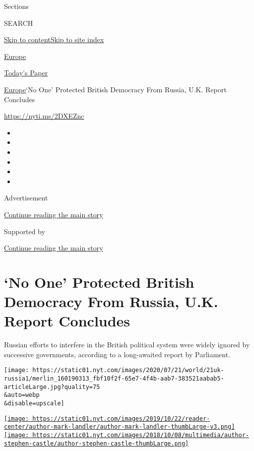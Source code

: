 Sections

SEARCH

\protect\hyperlink{site-content}{Skip to
content}\protect\hyperlink{site-index}{Skip to site index}

\href{https://www.nytimes.com/section/world/europe}{Europe}

\href{https://myaccount.nytimes.com/auth/login?response_type=cookie\&client_id=vi}{}

\href{https://www.nytimes.com/section/todayspaper}{Today's Paper}

\href{/section/world/europe}{Europe}\textbar{}`No One' Protected British
Democracy From Russia, U.K. Report Concludes

\url{https://nyti.ms/2DXEZnc}

\begin{itemize}
\item
\item
\item
\item
\item
\item
\end{itemize}

Advertisement

\protect\hyperlink{after-top}{Continue reading the main story}

Supported by

\protect\hyperlink{after-sponsor}{Continue reading the main story}

\hypertarget{no-one-protected-british-democracy-from-russia-uk-report-concludes}{%
\section{`No One' Protected British Democracy From Russia, U.K. Report
Concludes}\label{no-one-protected-british-democracy-from-russia-uk-report-concludes}}

Russian efforts to interfere in the British political system were widely
ignored by successive governments, according to a long-awaited report by
Parliament.

\texttt{[image: https://static01.nyt.com/images/2020/07/21/world/21uk-russia1/merlin\_160190313\_fbf10f2f-65e7-4f4b-aab7-383521aabab5-articleLarge.jpg?quality=75\\\&auto=webp\\\&disable=upscale]}

\href{https://www.nytimes.com/by/mark-landler}{\texttt{[image: https://static01.nyt.com/images/2019/10/22/reader-center/author-mark-landler/author-mark-landler-thumbLarge-v3.png]}}\href{https://www.nytimes.com/by/stephen-castle}{\texttt{[image: https://static01.nyt.com/images/2018/10/08/multimedia/author-stephen-castle/author-stephen-castle-thumbLarge.png]}}

